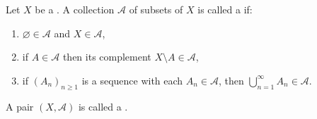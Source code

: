 \begin{definition} \label{definition:sigma_algebra_on_a_set_and_measurable_space}
Let $X$ be a .
A collection $\mathcal{A}$ of subsets of $X$ is called a  if:
\begin{enumerate}
  \item $\varnothing \in \mathcal{A}$ and $X \in \mathcal{A}$,
  \item if $A \in \mathcal{A}$ then its complement $X \setminus A \in \mathcal{A}$,
  \item if $(A_n)_{n\ge 1}$ is a sequence with each $A_n \in \mathcal{A}$, then $\bigcup_{n=1}^\infty A_n \in \mathcal{A}$.
\end{enumerate}
A pair $(X,\mathcal{A})$ is called a .
\end{definition}